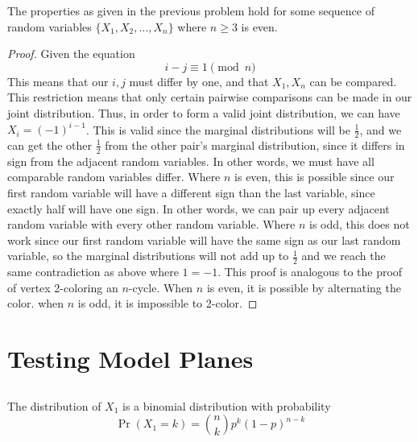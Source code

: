 \documentclass{article}
\begin{document}
\begin{theorem}
    The properties as given in the previous problem hold for some sequence of random variables \(\{X_1, X_2, \ldots, X_n\}\) where \(n \geqslant 3\) is even.
\end{theorem}
\begin{proof}
    Given the equation
    \begin{equation}
        i - j \equiv 1 \pmod{n}
    \end{equation}
    This means that our \(i, j\) must differ by one, and that \(X_1, X_n\) can be compared.
    This restriction means that only certain pairwise comparisons can be made in our joint distribution.
    Thus, in order to form a valid joint distribution, we can have \(X_i = (-1)^{i - 1}\).
    This is valid since the marginal distributions will be \(\frac{1}{2}\), and we can get the other \(\frac{1}{2}\) from the other pair's marginal distribution, since it differs in sign from the adjacent random variables.
    In other words, we must have all comparable random variables differ.
    Where \(n\) is even, this is possible since our first random variable will have a different sign than the last variable, since exactly half will have one sign.
    In other words, we can pair up every adjacent random variable with every other random variable.
    Where \(n\) is odd, this does not work since our first random variable will have the same sign as our last random variable, so the marginal distributions will not add up to \(\frac{1}{2}\) and we reach the same contradiction as above where \(1 = -1\).
    This proof is analogous to the proof of vertex 2-coloring an \(n\)-cycle.
    When \(n\) is even, it is possible by alternating the color.
    when \(n\) is odd, it is impossible to 2-color.
\end{proof}

\section{Testing Model Planes}

\subsection{}

The distribution of \(X_1\) is a binomial distribution with probability
\begin{equation}
    \Pr(X_1 = k) = \binom{n}{k} p^k (1 - p)^{n - k}
\end{equation}
\end{document}
